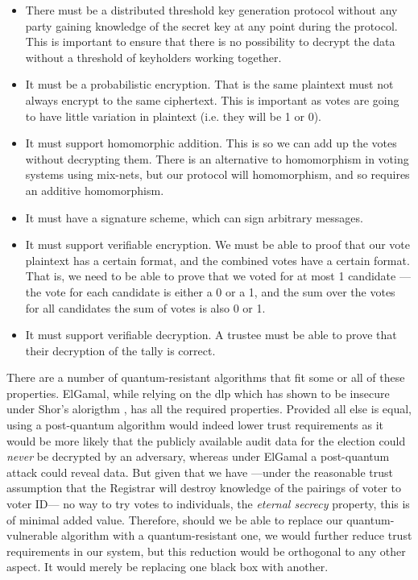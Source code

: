 \begin{itemize}
    \item There must be a distributed threshold key generation protocol without any party gaining knowledge of the secret key at any point during the protocol. This is important to ensure that there is no possibility to decrypt the data without a threshold of keyholders working together.
    \item It must be a probabilistic encryption. That is the same plaintext must not always encrypt to the same ciphertext. This is important as votes are going to have little variation in plaintext (i.e. they will be 1 or 0).
    \item It must support homomorphic addition. This is so we can add up the votes without decrypting them. There is an alternative to homomorphism in voting systems using mix-nets, but our protocol will homomorphism, and so requires an additive homomorphism.
    \item It must have a signature scheme, which can sign arbitrary messages.
    \item It must support verifiable encryption. We must be able to proof that our vote plaintext has a certain format, and the combined votes have a certain format. That is, we need to be able to prove that we voted for at most 1 candidate --- the vote for each candidate is either a 0 or a 1, and the sum over the votes for all candidates the sum of votes is also 0 or 1.
    \item It must support verifiable decryption. A trustee must be able to prove that their decryption of the tally is correct.
\end{itemize}

There are a number of quantum-resistant algorithms  that fit some or all of these properties. ElGamal, while relying on the \gls{dlp} which has shown to be insecure under Shor's alorigthm \cite{shorAlgorithmsQuantumComputation1994}, has all the required properties. Provided all else is equal, using a post-quantum algorithm would indeed lower trust requirements as it would be more likely that the publicly available audit data for the election could \emph{never} be decrypted by an adversary, whereas under ElGamal a post-quantum attack could reveal data. But given that we have ---under the reasonable trust assumption that the Registrar will destroy knowledge of the pairings of voter to voter ID--- no way to try votes to individuals, the \emph{eternal secrecy} property, this is of minimal added value. Therefore, should we be able to replace our quantum-vulnerable algorithm with a quantum-resistant one, we would further reduce trust requirements in our system, but this reduction would be orthogonal to any other aspect. It would merely be replacing one black box with another.

